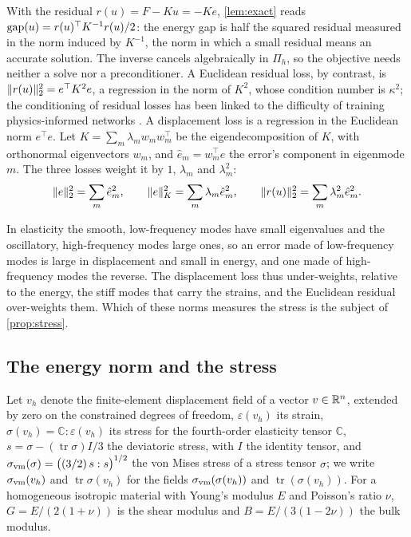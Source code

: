 \begin{remark}\label{rem:norms}
With the residual $r(u)=F-Ku=-Ke$, \cref{lem:exact} reads
$\operatorname{gap}(u)=r(u)^{\top}K^{-1}r(u)/2$: the energy gap is half the squared residual
measured in the norm induced by $K^{-1}$, the norm in which a small residual means an
accurate solution. The inverse cancels algebraically in $\Pi_h$, so the objective needs
neither a solve nor a preconditioner. A Euclidean residual loss, by contrast, is
$\lVert r(u)\rVert_2^2=e^{\top}K^{2}e$, a regression in the norm of $K^2$, whose condition number
is $\kappa^2$; the conditioning of residual losses has been linked to the difficulty of
training physics-informed networks \cite{WangYuPerdikaris2022,DeRyck2024}. A displacement
loss is a regression in the Euclidean norm $e^{\top}e$. Let $K=\sum_{m}\lambda_m
w_mw_m^{\top}$ be the eigendecomposition of $K$, with orthonormal eigenvectors $w_m$, and
$\hat e_m=w_m^{\top}e$ the error's component in eigenmode $m$. The three losses weight it by
$1$, $\lambda_m$ and $\lambda_m^2$:
\begin{equation}
\lVert e\rVert_2^2=\sum_m\hat e_m^2,\qquad
\lVert e\rVert_K^2=\sum_m\lambda_m\hat e_m^2,\qquad
\lVert r(u)\rVert_2^2=\sum_m\lambda_m^2\hat e_m^2 .
\label{eq:norms}
\end{equation}
\end{remark}

In elasticity the smooth, low-frequency modes have small eigenvalues and the oscillatory,
high-frequency modes large ones, so an error made of low-frequency modes is large in
displacement and small in energy, and one made of high-frequency modes the reverse. The
displacement loss thus under-weights, relative to the energy, the stiff modes that carry the
strains, and the Euclidean residual over-weights them. Which of these norms measures the
stress is the subject of \cref{prop:stress}.

\subsection{The energy norm and the stress}\label{sec:theory:stress}

Let $v_h$ denote the finite-element displacement field of a vector \mbox{$v\in\mathbb{R}^n$}, extended by
zero on the constrained degrees of freedom, $\varepsilon(v_h)$ its strain,
\mbox{$\sigma(v_h)=\mathbb{C}:\varepsilon(v_h)$} its stress for the fourth-order elasticity
tensor $\mathbb{C}$, $s=\sigma-(\operatorname{tr}\sigma)I/3$ the deviatoric stress, with
$I$ the identity tensor, and
$\sigma_{\mathrm{vm}}(\sigma)=\bigl((3/2)\,s:s\bigr)^{1/2}$ the von Mises stress of a stress tensor
$\sigma$; we write $\sigma_{\mathrm{vm}}(v_h)$ and $\operatorname{tr}\sigma(v_h)$ for the fields
$\sigma_{\mathrm{vm}}(\sigma(v_h))$ and $\operatorname{tr}(\sigma(v_h))$. For a homogeneous isotropic material with
Young's modulus $E$ and Poisson's ratio $\nu$, $G=E/(2(1+\nu))$ is the shear modulus and
$B=E/(3(1-2\nu))$ the bulk modulus.

